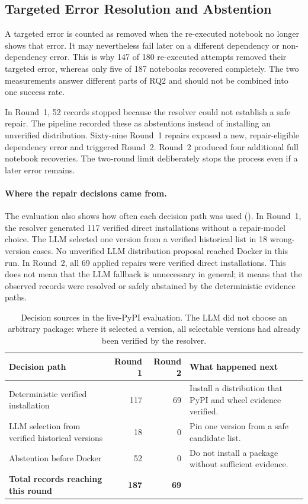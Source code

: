 \subsection{Targeted Error Resolution and Abstention}
\label{sec:v-final-targeted}

A targeted error is counted as removed when the re-executed notebook no longer
shows that error. It may nevertheless fail later on a different dependency or
non-dependency error. This is why 147 of 180 re-executed attempts removed their
targeted error, whereas only five of 187 notebooks recovered completely. The
two measurements answer different parts of RQ2 and should not be combined into
one success rate.

In Round~1, 52 records stopped because the resolver could not establish a safe
repair. The pipeline recorded these as abstentions instead of installing an
unverified distribution. Sixty-nine Round~1 repairs exposed a new,
repair-eligible dependency error and triggered Round~2. Round~2 produced four
additional full notebook recoveries. The two-round limit deliberately stops the
process even if a later error remains.
\label{sec:v-final-abstention}

\paragraph{Where the repair decisions came from.}
The evaluation also shows how often each decision path was used
(). In Round~1, the resolver generated 117
verified direct installations without a repair-model choice. The LLM selected
one version from a verified historical list in 18 wrong-version cases. No
unverified LLM distribution proposal reached Docker in this run. In Round~2,
all 69 applied repairs were verified direct installations. This does not mean
that the LLM fallback is unnecessary in general; it means that the observed
records were resolved or safely abstained by the deterministic evidence paths.

\begin{table}[htbp]
  \centering
  \small
  \begin{tabular}{|p{6.5cm}|r|r|p{3.2cm}|}
    \hline
    \textbf{Decision path} & \textbf{Round 1} & \textbf{Round 2} & \textbf{What happened next} \\
    \hline
    Deterministic verified installation & 117 & 69 & Install a distribution that PyPI and wheel evidence verified. \\
    \hline
    LLM selection from verified historical versions & 18 & 0 & Pin one version from a safe candidate list. \\
    \hline
    Abstention before Docker & 52 & 0 & Do not install a package without sufficient evidence. \\
    \hline
    \textbf{Total records reaching this round} & \textbf{187} & \textbf{69} & \\
    \hline
  \end{tabular}
  \caption{Decision sources in the live-PyPI evaluation. The LLM did not
  choose an arbitrary package: where it selected a version, all selectable
  versions had already been verified by the resolver.}
  \label{tab:v-decision-sources}
\end{table}

